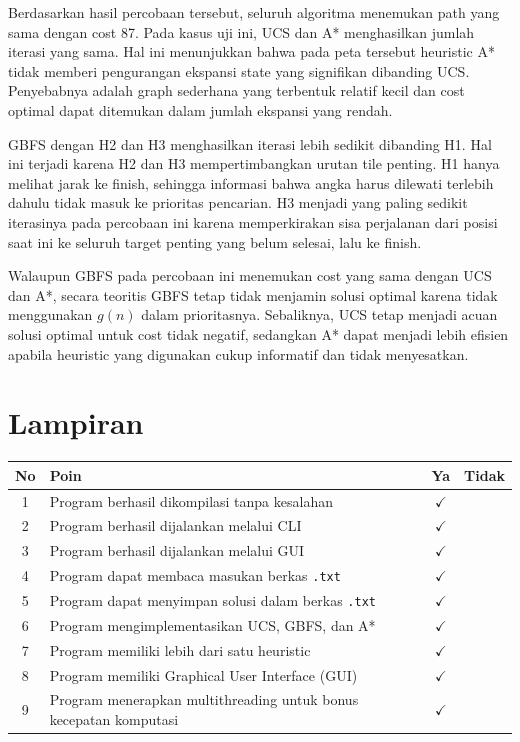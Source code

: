 \documentclass[a4paper,11pt]{article}
\begin{document}
Berdasarkan hasil percobaan tersebut, seluruh algoritma menemukan path yang sama dengan cost 87. Pada kasus uji ini, UCS dan A* menghasilkan jumlah iterasi yang sama. Hal ini menunjukkan bahwa pada peta tersebut heuristic A* tidak memberi pengurangan ekspansi state yang signifikan dibanding UCS. Penyebabnya adalah graph sederhana yang terbentuk relatif kecil dan cost optimal dapat ditemukan dalam jumlah ekspansi yang rendah.

GBFS dengan H2 dan H3 menghasilkan iterasi lebih sedikit dibanding H1. Hal ini terjadi karena H2 dan H3 mempertimbangkan urutan tile penting. H1 hanya melihat jarak ke finish, sehingga informasi bahwa angka harus dilewati terlebih dahulu tidak masuk ke prioritas pencarian. H3 menjadi yang paling sedikit iterasinya pada percobaan ini karena memperkirakan sisa perjalanan dari posisi saat ini ke seluruh target penting yang belum selesai, lalu ke finish.

Walaupun GBFS pada percobaan ini menemukan cost yang sama dengan UCS dan A*, secara teoritis GBFS tetap tidak menjamin solusi optimal karena tidak menggunakan $g(n)$ dalam prioritasnya. Sebaliknya, UCS tetap menjadi acuan solusi optimal untuk cost tidak negatif, sedangkan A* dapat menjadi lebih efisien apabila heuristic yang digunakan cukup informatif dan tidak menyesatkan.

\newpage
\section{Lampiran}

\begin{table}[H]
    \centering
    \renewcommand{\arraystretch}{1.5}
    \begin{tabular}{|c|p{9.5cm}|c|c|}
        \hline
        \textbf{No} & \textbf{Poin} & \textbf{Ya} & \textbf{Tidak} \\
        \hline
        1 & Program berhasil dikompilasi tanpa kesalahan & $\checkmark$ &  \\
        \hline
        2 & Program berhasil dijalankan melalui CLI & $\checkmark$ &  \\
        \hline
        3 & Program berhasil dijalankan melalui GUI & $\checkmark$ &  \\
        \hline
        4 & Program dapat membaca masukan berkas \texttt{.txt} & $\checkmark$ &  \\
        \hline
        5 & Program dapat menyimpan solusi dalam berkas \texttt{.txt} & $\checkmark$ &  \\
        \hline
        6 & Program mengimplementasikan UCS, GBFS, dan A* & $\checkmark$ &  \\
        \hline
        7 & Program memiliki lebih dari satu heuristic & $\checkmark$ &  \\
        \hline
        8 & Program memiliki Graphical User Interface (GUI) & $\checkmark$ &  \\
        \hline
        9 & Program menerapkan multithreading untuk bonus kecepatan komputasi & $\checkmark$ &  \\
        \hline
    \end{tabular}
\end{table}
\end{document}
